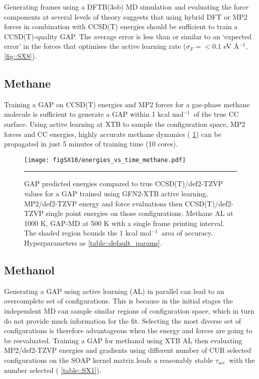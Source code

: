 \documentclass[11pt]{article}
\numberwithin{equation}{subsection}
\newcommand{\kcal}{kcal mol$^{-1}$}
\newcommand{\tacc}{$\tau_\text{acc}$}
\begin{document}
Generating frames using a DFTB(3ob) MD simulation and evaluating the force components at several levels of theory  suggests that using hybrid DFT or MP2 forces in combination with CCSD(T) energies should be sufficient to train a CCSD(T)-quality GAP. The average error is less than or similar to an `expected error' in the forces that optimises the active learning rate ($\sigma_F = <0.1$ eV \AA${}^{-1}$, \figurename{ \ref{fig::SX8}}). 


\subsection{Methane}
Training a GAP on CCSD(T) energies and MP2 forces for a gas-phase methane molecule is sufficient to generate a GAP within 1 \kcal~of the true CC surface. Using active learning at XTB to sample the configuration space, MP2 forces and CC energies, highly accurate methane dynamics (\figurename{ \ref{fig::SX10}}) can be propagated in just 5 minutes of training time (10 cores).


\begin{figure}[h!]
	\centering
	\vspace{0.4cm}
	\texttt{[image: figSX10/energies\_vs\_time\_methane.pdf]}
	\vspace{0.1cm}
	\hrule
	\vspace{0.1cm}
	\caption{GAP predicted energies compared to true CCSD(T)/def2-TZVP values for a GAP trained using GFN2-XTB active learning, MP2/def2-TZVP energy and force evaluations then CCSD(T)/def2-TZVP single point energies on those configurations. Methane AL at 1000 K, GAP-MD at 500 K with a single frame printing interval. The shaded region bounds the 1 \kcal~area of accuracy. Hyperparameters as \tablename{ \ref{table::default_params}}.}
	\label{fig::SX10}
\end{figure}


\subsection{Methanol}

Generating a GAP using active learning (AL) in parallel can lead to an overcomplete set of configurations. This is because in the initial stages the independent MD can sample similar regions of configuration space, which in turn do not provide much information for the fit. Selecting the most diverse set of configurations is therefore advantageous when the energy and forces are going to be reevaluated. Training a GAP for methanol using XTB AL then evaluating MP2/def2-TZVP energies and gradients using different number of CUR\supercite{Mahoney2009} selected configurations on the SOAP kernel matrix leads a reasonably stable \tacc~with the number selected (\tablename{ \ref{table::SX1}}).
\end{document}
